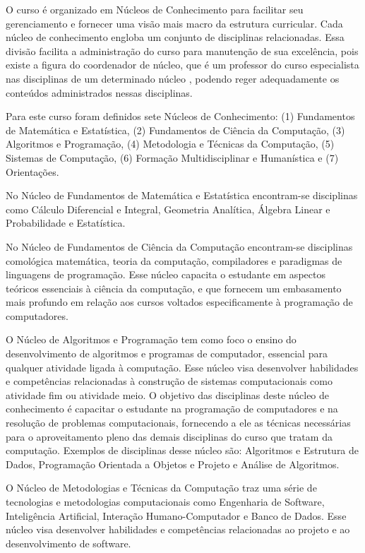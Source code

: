O curso é organizado em Núcleos de Conhecimento para facilitar seu gerenciamento e fornecer uma visão mais macro da estrutura curricular. Cada núcleo de conhecimento engloba um conjunto de disciplinas relacionadas. Essa divisão facilita a administração do curso para manutenção de sua excelência, pois existe a figura do coordenador de núcleo, que é um professor do curso especialista nas disciplinas de um determinado núcleo , podendo reger adequadamente os conteúdos administrados nessas disciplinas. 

Para este curso foram definidos sete Núcleos de Conhecimento: (1) Fundamentos de Matemática e Estatística, (2) Fundamentos de Ciência da Computação, (3) Algoritmos e Programação, (4) Metodologia e Técnicas da Computação, (5) Sistemas de Computação, (6) Formação Multidisciplinar e Humanística e (7) Orientações. 

No Núcleo de Fundamentos de Matemática e Estatística encontram-se disciplinas como Cálculo Diferencial e Integral, Geometria Analítica, Álgebra Linear e Probabilidade e Estatística.

No Núcleo de Fundamentos de Ciência da Computação encontram-se disciplinas comológica matemática, teoria da computação, compiladores e paradigmas de linguagens de programação. Esse núcleo capacita o estudante em aspectos teóricos essenciais à ciência da computação, e que fornecem um embasamento mais profundo em relação aos cursos voltados especificamente à programação de computadores. 

O Núcleo de Algoritmos e Programação tem como foco o ensino do desenvolvimento de algoritmos e programas de computador, essencial para qualquer atividade ligada à computação. Esse núcleo visa desenvolver habilidades e competências relacionadas à construção de sistemas computacionais como atividade fim ou atividade meio. O objetivo das disciplinas deste núcleo de conhecimento é capacitar o estudante na programação de computadores e na resolução de problemas computacionais, fornecendo a ele as técnicas necessárias para o aproveitamento pleno das demais disciplinas do curso que tratam da computação. Exemplos de disciplinas desse núcleo são: Algoritmos e Estrutura de Dados, Programação Orientada a Objetos e Projeto e Análise de Algoritmos. 

O Núcleo de Metodologias e Técnicas da Computação traz uma série de tecnologias e metodologias computacionais como Engenharia de Software, Inteligência Artificial, Interação Humano-Computador e Banco de Dados. Esse núcleo visa desenvolver habilidades e competências relacionadas ao projeto e ao desenvolvimento de software.

